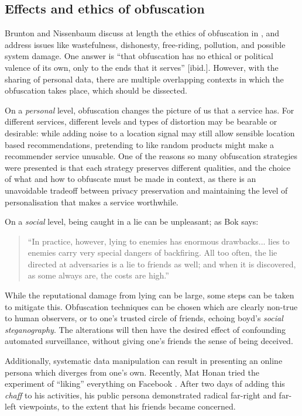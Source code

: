 \documentclass{IOS-Book-Article}     %
\newcommand{\tbox}[3][red]{{
\color{#1}\noindent{
   \fbox{\scriptsize{ {\bf #2} \textsl{#3}}}
   \vspace{2pt}
}
}}
\newcommand{\todo}[1]{\tbox{TODO:}{#1}}
\begin{document}
\subsection{Effects and ethics of obfuscation}
Brunton and Nissenbaum discuss at length the ethics of obfuscation in
\cite{brunton2011vernacular}, and address issues like wastefulness, dishonesty,
free-riding, pollution, and possible system damage. One answer is ``that
obfuscation has no ethical or political valence of its own, only to the ends
that it serves'' [ibid.]. However, with the sharing of personal data, there are
multiple overlapping contexts in which the obfuscation takes place, which should
be dissected.

On a \emph{personal} level, obfuscation changes the picture of us that a service
has. For different services, different levels and types of distortion may be
bearable or desirable: while adding noise to a location signal may still allow
sensible location based recommendations, pretending to like random products
might make a recommender service unusable. 
 One of the reasons so many obfuscation strategies were presented is
that each strategy preserves different qualities, and the choice of what and how
to obfuscate must be made in context, as there is an unavoidable tradeoff
between privacy preservation and maintaining the level of personalisation that
makes a service worthwhile.

On a \emph{social} level, being caught in a lie can be unpleasant; as
Bok says:
\begin{quote}
``In practice, however, lying to enemies has enormous drawbacks...  lies to
enemies carry very special dangers of backfiring. All too often, the lie
directed at adversaries is a lie to friends as well; and when it is discovered,
as some always are, the costs are high.'' \cite[p. 141]{bok1978lying} 
\end{quote}
While the reputational damage from lying can be large, some steps can be taken
to mitigate this. Obfuscation techniques can be chosen which are
clearly non-true to human observers, or to one's trusted circle of friends,
echoing boyd's \emph{social steganography}\cite{boyd2012Networked}. The
alterations will then have the desired effect of confounding automated
surveillance, without giving one's friends the sense of being deceived.

Additionally, systematic data manipulation can result in presenting an online
persona which diverges from one's own. Recently, Mat Honan tried the experiment
of ``liking'' everything on Facebook \cite{honan2014Facebook}. After two days of
adding this \emph{chaff} to his activities, his public persona demonstrated
radical far-right and far-left viewpoints, to the extent that his friends became
concerned.
\end{document}
